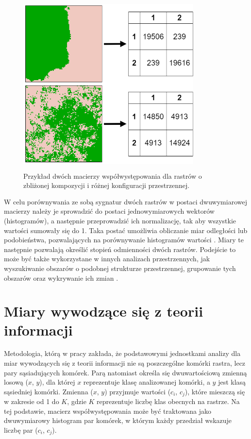 \documentclass{amuthesis}
\begin{document}
\begin{figure}[t]

{\centering \includegraphics[width=3.64583in,height=3.64583in]{figures/diagram_coma.png}

}

\caption{\label{fig-metody-coma}Przykład dwóch macierzy
współwystępowania dla rastrów o zbliżonej kompozycji i różnej
konfiguracji przestrzennej.}

\end{figure}

W celu porównywania ze sobą sygnatur dwóch rastrów w postaci
dwuwymiarowej macierzy należy je sprowadzić do postaci jednowymiarowych
wektorów (histogramów), a następnie przeprowadzić ich normalizację, tak
aby wszystkie wartości sumowały się do 1. Taka postać umożliwia
obliczanie miar odległości lub podobieństwa, pozwalających na
porównywanie histogramów wartości \autocite{Cha2007}. Miary te następnie
pozwalają określić stopień odmienności dwóch rastrów. Podejście to może
być także wykorzystane w innych analizach przestrzennych, jak
wyszukiwanie obszarów o podobnej strukturze przestrzennej, grupowanie
tych obszarów oraz wykrywanie ich zmian
\autocite{Jasiewicz_GeoPAT,nowosad_motif}.

\hypertarget{miary-wywodzux105ce-siux119-z-teorii-informacji}{%
\section{Miary wywodzące się z teorii
informacji}\label{miary-wywodzux105ce-siux119-z-teorii-informacji}}

Metodologia, którą w pracy \textcite{nowosad_it} zakłada, że
podstawowymi jednostkami analizy dla miar wywodzących się z teorii
informacji nie są poszczególne komórki rastra, lecz pary sąsiadujących
komórek. Parą natomiast określa się dwuwartościową zmienną losową
(\(x\), \(y\)), dla której \(x\) reprezentuje klasę analizowanej
komórki, a \(y\) jest klasą sąsiedniej komórki. Zmienna (\(x\), \(y\))
przyjmuje wartości (\(c_i\), \(c_j\)), które mieszczą się w zakresie od
1 do \(K\), gdzie \(K\) reprezentuje liczbę klas obecnych na rastrze. Na
tej podstawie, macierz współwystępowania może być traktowana jako
dwuwymiarowy histogram par komórek, w którym każdy przedział wskazuje
liczbę par (\(c_i\), \(c_j\)).
\end{document}
